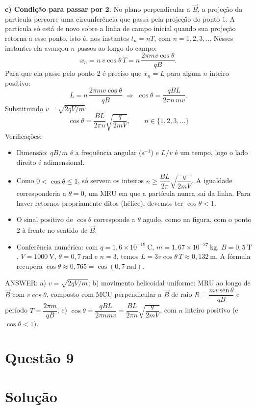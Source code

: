 \documentclass{article}%
\begin{document}
\textbf{c) Condição para passar por 2.} No plano perpendicular a $\vec B$, a projeção da partícula percorre uma circunferência que passa pela projeção do ponto 1. A partícula só está de novo sobre a linha de campo inicial quando sua projeção retorna a esse ponto, isto é, nos instantes $t_n=nT$, com $n=1,2,3,\dots$ Nesses instantes ela avançou $n$ passos ao longo do campo:
\[
x_n=n\,v\cos\theta\,T=n\,\frac{2\pi m v\cos\theta}{qB}.
\]
Para que ela passe pelo ponto 2 é preciso que $x_n=L$ para algum $n$ inteiro positivo:
\[
L=n\,\frac{2\pi m v\cos\theta}{qB}\;\Longrightarrow\;
\cos\theta=\frac{qBL}{2\pi n\,m v}.
\]
Substituindo $v=\sqrt{2qV/m}$:
\[
\boxed{\cos\theta=\frac{BL}{2\pi n}\sqrt{\frac{q}{2mV}},\qquad n\in\{1,2,3,\dots\}}
\]
Verificações:
\begin{itemize}
\item Dimensão: $qB/m$ é a frequência angular ($\mathrm{s^{-1}}$) e $L/v$ é um tempo, logo o lado direito é adimensional.
\item Como $0<\cos\theta\le 1$, só servem os inteiros $n\ge \dfrac{BL}{2\pi}\sqrt{\dfrac{q}{2mV}}$. A igualdade corresponderia a $\theta=0$, um MRU em que a partícula nunca sai da linha. Para haver retornos propriamente ditos (hélice), devemos ter $\cos\theta<1$.
\item O sinal positivo de $\cos\theta$ corresponde a $\theta$ agudo, como na figura, com o ponto 2 à frente no sentido de $\vec B$.
\item Conferência numérica: com $q=1{,}6\times10^{-19}\ \mathrm{C}$, $m=1{,}67\times10^{-27}\ \mathrm{kg}$, $B=0{,}5\ \mathrm{T}$, $V=1000\ \mathrm{V}$, $\theta=0{,}7\ \mathrm{rad}$ e $n=3$, temos $L=3v\cos\theta\,T\approx0{,}132\ \mathrm{m}$. A fórmula recupera $\cos\theta\approx0{,}765=\cos(0{,}7\ \mathrm{rad})$.
\end{itemize}

ANSWER: a) $v=\sqrt{2qV/m}$; b) movimento helicoidal uniforme: MRU ao longo de $\vec B$ com $v\cos\theta$, composto com MCU perpendicular a $\vec B$ de raio $R=\dfrac{mv\,\mathrm{sen}\,\theta}{qB}$ e período $T=\dfrac{2\pi m}{qB}$; c) $\cos\theta=\dfrac{qBL}{2\pi n m v}=\dfrac{BL}{2\pi n}\sqrt{\dfrac{q}{2mV}}$, com $n$ inteiro positivo (e $\cos\theta<1$).%
\newpage%
\section*{Questão 9}

\section*{Solução}
\end{document}
